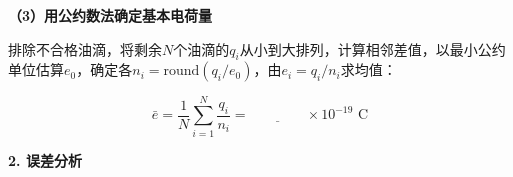 \documentclass[a4paper,12pt]{article}
\begin{document}
\vspace{0.5cm}

{\fontsize{12pt}{18pt}\selectfont

\textbf{（3）用公约数法确定基本电荷量}

排除不合格油滴，将剩余$N$个油滴的$q_i$从小到大排列，计算相邻差值，以最小公约单位估算$e_0$，确定各$n_i = \text{round}(q_i/e_0)$，由$e_i = q_i/n_i$求均值：

\begin{equation}
    \bar{e} = \frac{1}{N}\sum_{i=1}^{N}\frac{q_i}{n_i} = \underline{\qquad\qquad} \times 10^{-19} \text{ C}
\end{equation}

}

\vspace{0.5cm}

{\fontsize{14pt}{20pt}\selectfont \textbf{2. 误差分析}}

\vspace{0.3cm}
\end{document}
